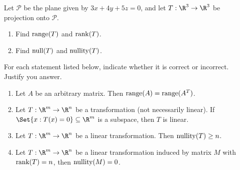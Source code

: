\begin{exercises}
\begin{problist}
		\prob Let $\mathcal P$ be the plane given by $3x+4y+5z=0$, and let $T:\R^3\to\R^3$ be projection onto $\mathcal P$. 
		\begin{enumerate}
		    \item Find $\operatorname{range}(T)$ and $\operatorname{rank}(T)$.
		    \item Find $\operatorname{null}(T)$ and $\operatorname{nullity}(T)$.
		\end{enumerate}
		\prob For each statement listed below, indicate whether it is correct or incorrect. Justify you answer.
		\begin{enumerate}
		    \item Let $A$ be an arbitrary matrix. Then $\operatorname{range}(A)=\operatorname{range}(A^T)$.
		    \item Let $T:\R^m\to\R^n$ be a transformation (not necessarily linear). If $\Set{x:T(x)=0} \subseteq \R^m$ is a subspace, then $T$ is linear.
		    \item Let $T:\R^m\to\R^n$ be a linear transformation. Then $\operatorname{nullity}(T) \geq n$.
		    \item Let $T:\R^m\to\R^n$ be a linear transformation induced by matrix $M$ with $\operatorname{rank}(T) = n$, then $\operatorname{nullity}(M) = 0$.
		\end{enumerate}

	\end{problist}
\end{exercises}
